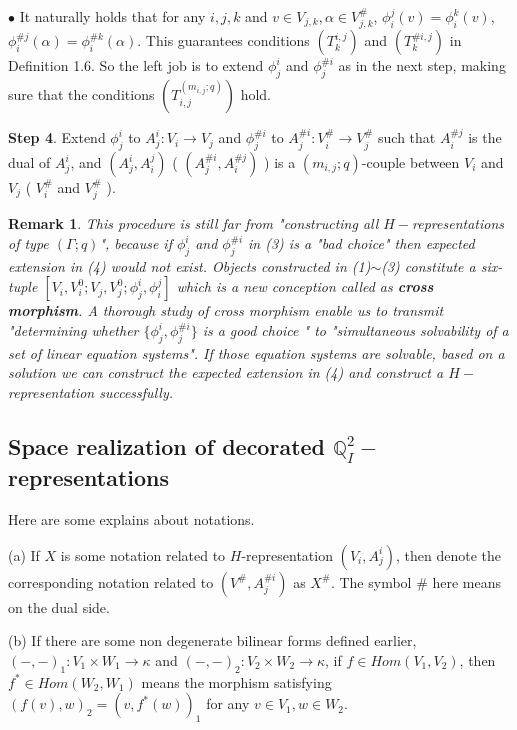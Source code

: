 \def\CTEXPreproc{Created by ctex v0.2.12, don't edit!}\documentclass[11pt]{article}
\newtheorem{rem}{Remark}[section]
\begin{document}
\noindent $\bullet$ It naturally holds that for any $i,j,k$ and $v\in V_{j,k}  , \alpha \in V^{\#}_{j,k}$, $\phi^j _i (v)= \phi^k _i (v)$, $\phi^{\# j}_i (\alpha)=\phi^{\# k}_i (\alpha)  $. This guarantees conditions $(T^{i,j}_k )$ and $( T^{\# i,j}_k  )$ in Definition 1.6. So
 the left job is to extend $\phi^i _j $ and $\phi^{\# i} _j$ as in the next step, making sure that the conditions $( T^{( m_{i,j};q  )}_{i,j})$ hold.

\noindent \textbf{Step 4}.  Extend $\phi^i _j$ to $A^i _j : V_i \rightarrow V_j $ and $\phi^{\# i}_j $ to $A^{\# i} _j : V^{\#}_i \rightarrow V^{\#}_j $ such that $A^{\# j} _i $ is the dual of $A^i _j$, and $ ( A^i _j , A^j _i   )  $ ( $ ( A^{\# i} _j , A^{\# j} _i   )  $   ) is a $(m_{i,j} ;q)$-couple between $V_i $ and $V_j$  ( $V^{\#}_i $ and $V^{\#}_j$   ).

\begin{rem}
This procedure is still far from "constructing all $H-$representations of type $(\Gamma;q)$", because if $\phi^i _j $ and $\phi^{\# i}_j$ in (3) is a "bad choice" then expected extension in (4) would not exist.  Objects constructed in (1)$\sim$(3) constitute a six-tuple
$[V_{i} , V^{0}_{i}; V_{j}, V^0 _{j}; \phi^i _j , \phi^j _i   ]$ which is a new conception called as \textbf{cross morphism}. A thorough study of cross morphism enable us to transmit  "determining whether $\{  \phi^i _j , \phi^{\# i}_j  \}$ is a good choice " to "simultaneous solvability of a set of linear equation systems". If those equation systems are solvable, based on a solution we can construct the expected extension in (4) and construct a $H-$representation successfully.
\end{rem}




\subsection{Space realization of decorated $\mathbb{Q}^2 _{I}-$representations }


Here are some explains about notations.

(a) If $X$ is some notation related to $H$-representation $(V_i , A^{i}_{j})$, then denote the corresponding notation related to
$(V^{\#}  , A^{\# i}_j )$ as $X^{\#}$. The symbol $\#$ here means on the dual side.

(b) If there are some non degenerate bilinear forms defined earlier, $(-,-)_1 : V_1 \times W_1 \rightarrow \kappa $ and $ (-,-)_2 : V_2 \times W_2 \rightarrow \kappa$, if $f\in Hom( V_1 , V_2  ) $, then $f^* \in Hom (W_2 , W_1)$ means the morphism satisfying
$(f(v) ,w  )_2 = ( v, f^* (w)  )_1  $ for any $v\in V_1 , w\in W_2$.
\end{document}
